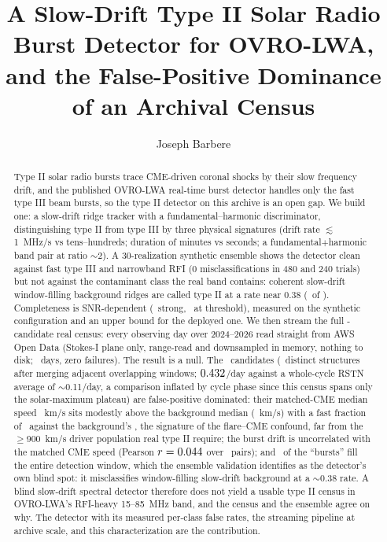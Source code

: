 \documentclass[twocolumn]{aastex631}
\begin{document}
\title{A Slow-Drift Type II Solar Radio Burst Detector for OVRO-LWA, and the
False-Positive Dominance of an Archival Census}
\author[0009-0008-3289-4447]{Joseph Barbere}

\begin{abstract}
Type II solar radio bursts trace CME-driven coronal shocks by their slow frequency drift, and the
published OVRO-LWA real-time burst detector \citep{ovrolwa_detector} handles only the fast type III
beam bursts, so the type II detector on this archive is an open gap. We build one: a slow-drift
ridge tracker with a fundamental--harmonic discriminator, distinguishing type II from type III by
three physical signatures (drift rate $\lesssim$1~MHz/s vs tens--hundreds; duration of minutes vs
seconds; a fundamental$+$harmonic band pair at ratio $\sim$2). A 30-realization synthetic ensemble
shows the detector clean against fast type III and narrowband RFI (0 misclassifications in 480
and 240 trials) but not against the contaminant class the real band contains: coherent
slow-drift window-filling background ridges are called type II at a rate near 0.38
(\tiiSynFpSlowBg\ of \tiiSynNSlowBg). Completeness is SNR-dependent (\tiiSynCompSnrfour\
strong, \tiiSynCompSnrtwo\ at threshold), measured on the synthetic configuration and an upper
bound for the deployed one. We then stream the full \tiiRealNTypeII-candidate real census: every observing day over
2024--2026 read straight from AWS Open Data (Stokes-I plane only, range-read and downsampled in
memory, nothing to disk; \tiiRealNEvents\ days, zero failures). The result is a null. The
\tiiRealNTypeII\ candidates (\tiiRealNDedup\ distinct structures after merging adjacent
overlapping windows; $0.432$/day against a whole-cycle RSTN average of $\sim$0.11/day,
a comparison inflated by cycle phase since this census spans only the solar-maximum plateau) are
false-positive dominated: their matched-CME median speed \tiiRealMatchCmeMed~km/s sits modestly
above the background median (\tiiRealBgCmeMed~km/s) with a fast fraction of
\tiiRealMatchFracFast\ against the background's \tiiRealBgFracFast, the signature of the
flare--CME confound, far from the $\ge$900~km/s driver population real type II require; the burst
drift is uncorrelated with the matched CME speed (Pearson $r=0.044$ over
\tiiRealNCorrPairs\ pairs); and \tiiRealWindowSat\ of the ``bursts'' fill the entire detection
window, which the ensemble validation identifies as the detector's own blind spot: it
misclassifies window-filling slow-drift background at a $\sim$0.38 rate. A blind slow-drift
spectral detector therefore does not yield a usable type II census in OVRO-LWA's RFI-heavy
15--85~MHz band, and the census and the ensemble agree on why. The detector with its measured
per-class false rates, the streaming pipeline at archive scale, and this characterization are the
contribution.
\end{abstract}
\end{document}
